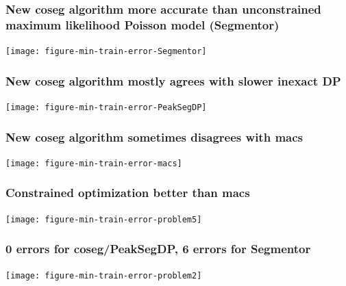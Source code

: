 \documentclass{beamer}
\begin{document}
\begin{frame}
  \frametitle{New coseg algorithm more accurate than unconstrained
    maximum likelihood Poisson model (Segmentor)}
  \texttt{[image: figure-min-train-error-Segmentor]}
\end{frame}

\begin{frame}
  \frametitle{New coseg algorithm mostly agrees with slower inexact DP}
  \texttt{[image: figure-min-train-error-PeakSegDP]}
\end{frame}

\begin{frame}
  \frametitle{New coseg algorithm sometimes disagrees with macs}
  \texttt{[image: figure-min-train-error-macs]}
\end{frame}

\begin{frame}
  \frametitle{Constrained optimization better than macs}
  \texttt{[image: figure-min-train-error-problem5]}
\end{frame}

\begin{frame}
  \frametitle{0 errors for coseg/PeakSegDP, 6 errors for Segmentor}
  \texttt{[image: figure-min-train-error-problem2]}
\end{frame}
\end{document}
